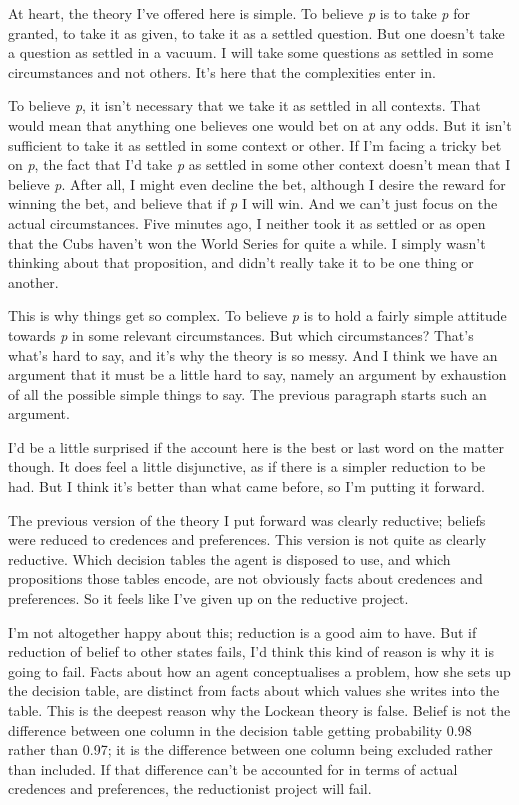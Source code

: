 At heart, the theory I've offered here is simple. To believe \emph{p} is to take \emph{p} for granted, to take it as given, to take it as a settled question. But one doesn't take a question as settled in a vacuum. I will take some questions as settled in some circumstances and not others. It's here that the complexities enter in.

To believe \emph{p}, it isn't necessary that we take it as settled in all contexts. That would mean that anything one believes one would bet on at any odds. But it isn't sufficient to take it as settled in some context or other. If I'm facing a tricky bet on \emph{p}, the fact that I'd take \emph{p} as settled in some other context doesn't mean that I believe \emph{p}. After all, I might even decline the bet, although I desire the reward for winning the bet, and believe that if \emph{p} I will win. And we can't just focus on the actual circumstances. Five minutes ago, I neither took it as settled or as open that the Cubs haven't won the World Series for quite a while. I simply wasn't thinking about that proposition, and didn't really take it to be one thing or another. 

This is why things get so complex. To believe \emph{p} is to hold a fairly simple attitude towards \emph{p} in some relevant circumstances. But which circumstances? That's what's hard to say, and it's why the theory is so messy. And I think we have an argument that it must be a little hard to say, namely an argument by exhaustion of all the possible simple things to say. The previous paragraph starts such an argument.

I'd be a little surprised if the account here is the best or last word on the matter though. It does feel a little disjunctive, as if there is a simpler reduction to be had. But I think it's better than what came before, so I'm putting it forward.

The previous version of the theory I put forward was clearly reductive; beliefs were reduced to credences and preferences. This version is not quite as clearly reductive. Which decision tables the agent is disposed to use, and which propositions those tables encode, are not obviously facts about credences and preferences. So it feels like I've given up on the reductive project.

I'm not altogether happy about this; reduction is a good aim to have. But if reduction of belief to other states fails, I'd think this kind of reason is why it is going to fail. Facts about how an agent conceptualises a problem, how she sets up the decision table, are distinct from facts about which values she writes into the table. This is the deepest reason why the Lockean theory is false. Belief is not the difference between one column in the decision table getting probability 0.98 rather than 0.97; it is the difference between one column being excluded rather than included. If that difference can't be accounted for in terms of actual credences and preferences, the reductionist project will fail.
